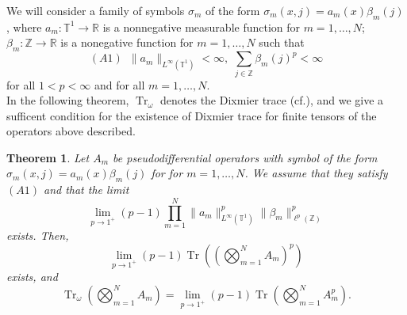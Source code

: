 \documentclass[a4paper,12pt,reqno]{amsart}
\newtheorem{thm}{Theorem}[section]
\theoremstyle{definition}
\theoremstyle{remark}
\numberwithin{equation}{section}
\newcommand{\er}{\mathbb{R}}
\newcommand{\zet}{\mathbb{Z}}
\newcommand{\T}{\mathbb{T}^1}
\newcommand{\beq}{\begin{equation}}
\newcommand{\eq}{\end{equation}}
\DeclareMathOperator{\Tr}{Tr}
\def\T{{{\mathbb T}^1}}
\begin{document}
We will consider a family of symbols $\sigma_m$ of the form  $\sigma_m(x,j)=a_m(x)\beta_m(j)$, where $a_m:\T\rightarrow\er$ is a nonnegative measurable function for $m=1,\dots, N$; $\beta_m:\zet\rightarrow \er$ 
is a nonegative function for $m=1,\dots, N$ such that 
\[ (A1)\,\,\,\|a_m\|_{L^{\infty}(\T)}<\infty,\,\, \sum\limits_{j\in\zet}\beta_m(j)^p<\infty\]
  for all $1<p<\infty$ and for all  $m=1,\dots, N$.\\

In the following theorem, $\Tr_{\omega}$ denotes the Dixmier trace (cf.\cite{Connes}), and we give a sufficent condition for the existence of Dixmier trace for finite tensors of the operators above described.

\begin{thm} Let $A_m$ be pseudodifferential operators with symbol of the form $\sigma_m(x,j)=a_m(x)\beta_m(j)$ for for $m=1,\dots, N$. We assume that they satisfy $(A1)$ and that the limit
\beq\label{dix1} \lim\limits_{p\rightarrow 1^{+}}(p-1)\prod\limits_{m=1}^{N}\|a_m\|_{L^{\infty}(\T)}^p\|\beta_m\|_{\ell^{p}(\zet)}^p\eq
exists. Then, 
\beq \label{dix2}
\lim\limits_{p\rightarrow 1^{+}}(p-1)\Tr\left(\left(\bigotimes_{m=1}^N A_m\right)^p \right) 
\eq
exists, and 
\beq \label{dix3}\Tr_{\omega}\left(\bigotimes_{m=1}^N A_m\right)=\lim\limits_{p\rightarrow 1^{+}}(p-1)\Tr\left(\bigotimes_{m=1}^N A_m^p\right) .\eq
\end{thm}
\end{document}
